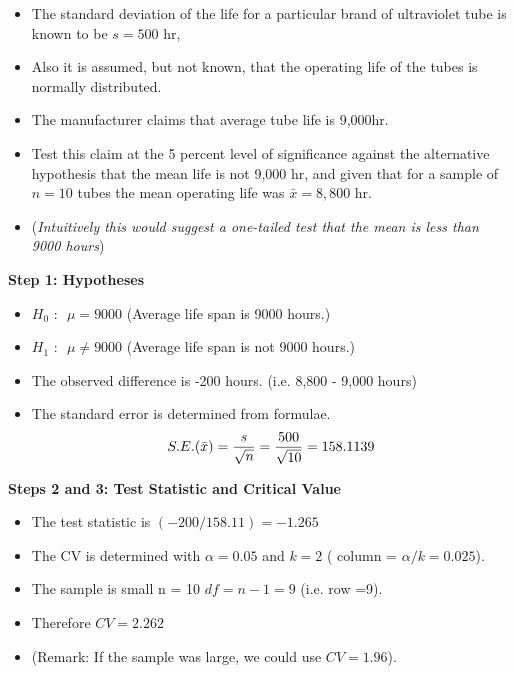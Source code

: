 \documentclass[a4paper,12pt]{article}
\begin{document}
\large 

\begin{itemize}
\item The standard deviation of the life for a particular brand of ultraviolet tube is known to be $s = 500$ hr,
\item Also it is assumed, but not known, that the operating life of the tubes is normally distributed. \item The manufacturer claims that average tube life
is 9,000hr. \item Test this claim at the 5 percent level of significance against the alternative hypothesis
that the mean life is not 9,000 hr, and given that for a sample of $n = 10$ tubes the mean operating
life was $\bar{x} = 8,800$ hr.
\item (\textit{Intuitively this would suggest a one-tailed test that the mean is less than 9000 hours})
\end{itemize}



\bigskip
\noindent \textbf{Step 1: Hypotheses }
\smallskip
\begin{itemize}
\item $H_0 \mbox{ : } $ $\mu = 9000$ (Average life span is 9000 hours.)
\item $H_1 \mbox{ : } $ $\mu \neq 9000$ (Average life span is not 9000 hours.)
\end{itemize}
\bigskip
\begin{itemize}
\item The observed difference is -200 hours. (i.e. 8,800 - 9,000 hours)
\item The standard error is determined from formulae.
\[ S.E. (\bar{x}) = {s \over \sqrt{n}} = {500 \over \sqrt{10}}  = 158.1139 \]
\end{itemize}


\newpage
\noindent \textbf{Steps 2 and 3: Test Statistic and Critical Value }
\smallskip
\begin{itemize}
\item The test statistic is $(-200 /  158.11) = -1.265$
\item The CV is determined with $\alpha = 0.05$ and $k = 2$ ( column = $\alpha/k=0.025$).
\item The sample is small n = 10 $df = n-1 = 9$ (i.e. row =9).
\item Therefore $CV = 2.262$

\item (Remark: If the sample was large, we could use $CV = 1.96$).

\end{itemize}
\end{document}
